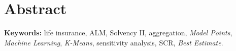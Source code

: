 \chapter*{Abstract}


\vspace{0.5cm}
\noindent \textbf{Keywords:} life insurance, ALM, Solvency II, aggregation, \textit{Model Points}, \textit{Machine Learning}, \textit{K-Means}, sensitivity analysis, SCR, \textit{Best Estimate}.